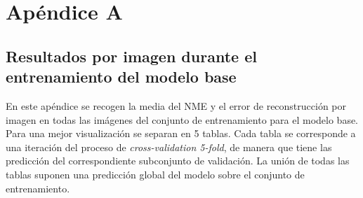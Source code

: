 
\chapter{Apéndice A}\label{ap:apendiceA}

\section*{Resultados por imagen durante el entrenamiento del modelo base}

En este apéndice se recogen la media del NME y el error de reconstrucción por imagen en todas las imágenes del conjunto de entrenamiento para el modelo base. Para una mejor visualización se separan en 5 tablas. Cada tabla se corresponde a una iteración del proceso de \textit{cross-validation 5-fold}, de manera que tiene las predicción del correspondiente subconjunto de validación. La unión de todas las tablas suponen una predicción global del modelo sobre el conjunto de entrenamiento.

